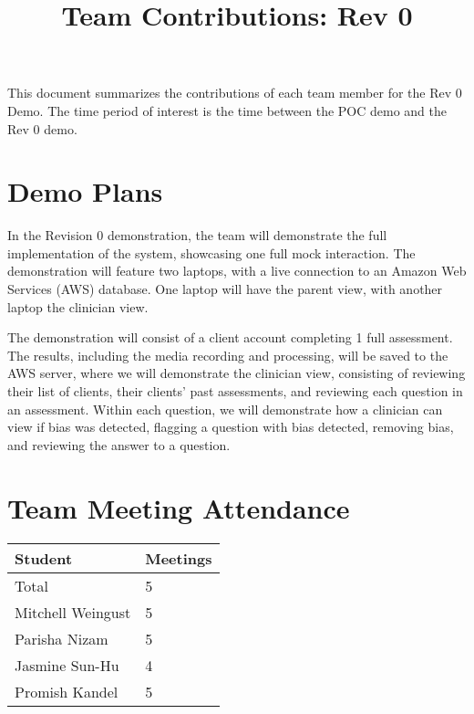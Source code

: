 \documentclass{article}
\title{Team Contributions: Rev 0\\\progname}
\author{\authname}
\date{}
\begin{document}
\maketitle

This document summarizes the contributions of each team member for the Rev 0
Demo.  The time period of interest is the time between the POC demo and the Rev
0 demo.

\section{Demo Plans}

\hspace{2em}In the Revision 0 demonstration, the team will demonstrate the full implementation of the system, showcasing
one full mock interaction. The demonstration will feature two laptops, with a live connection to an Amazon Web Services (AWS)
database. One laptop will have the parent view, with another laptop the clinician view.

The demonstration will consist of a client account completing 1 full assessment. The results, including the media recording and processing, will be saved
to the AWS server, where we will demonstrate the clinician view, consisting of reviewing their list of clients, their clients' past assessments,
and reviewing each question in an assessment. Within each question, we will demonstrate how a clinician can view if bias was detected, flagging a question
with bias detected, removing bias, and reviewing the answer to a question.

\section{Team Meeting Attendance}

\begin{table}[H]
\centering
\begin{tabular}{ll}
\toprule
\textbf{Student} & \textbf{Meetings}\\
\midrule
Total & 5\\
Mitchell Weingust & 5\\
Parisha Nizam & 5\\
Jasmine Sun-Hu & 4\\
Promish Kandel & 5\\
\bottomrule
\end{tabular}
\end{table}

\end{document}
